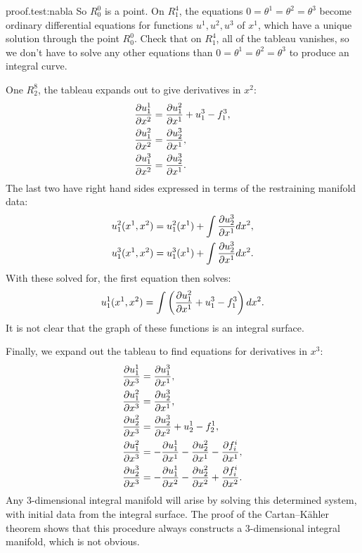 \begin{answer}{proof.test:nabla}
So \(R^0_0\) is a point.
On \(R^4_1\), the equations \(0=\theta^1=\theta^2=\theta^3\) become ordinary differential equations for functions \(u^1,u^2,u^3\) of \(x^1\), which have a unique solution through the point \(R^0_0\).
Check that on \(R^4_1\), all of the tableau vanishes, so we don't have to solve any other equations than \(0=\theta^1=\theta^2=\theta^3\) to produce an integral curve.

One \(R^8_2\), the tableau expands out to give derivatives in \(x^2\):
\begin{align*}
\pderiv{u^1_1}{x^2}&=\pderiv{u^2_1}{x^1}+u^3_1-f^3_1,\\
\pderiv{u^2_1}{x^2}&=\pderiv{u^3_2}{x^1},\\
\pderiv{u^3_1}{x^2}&=\pderiv{u^3_2}{x^1}.
\end{align*}
The last two have right hand sides expressed in terms of the restraining manifold data:
\begin{align*}
u^2_1(x^1,x^2)&=u^2_1(x^1)+\int \pderiv{u^3_2}{x^1} dx^2,\\
u^3_1(x^1,x^2)&=u^3_1(x^1)+\int \pderiv{u^3_2}{x^1} dx^2.
\end{align*}
With these solved for, the first equation then solves:
\[
u^1_1(x^1,x^2)=\int \left(\pderiv{u^2_1}{x^1}+u^3_1-f^3_1\right)dx^2.
\]
It is not clear that the graph of these functions is an integral surface.

Finally, we expand out the tableau to find equations for derivatives in \(x^3\):
\begin{align*}
\pderiv{u^1_1}{x^3}&=\pderiv{u^3_1}{x^1},\\
\pderiv{u^2_1}{x^3}&=\pderiv{u^3_2}{x^1},\\
\pderiv{u^2_2}{x^3}&=\pderiv{u^3_2}{x^2}+u^1_2-f^1_2,\\
\pderiv{u^2_1}{x^3}&=-\pderiv{u^1_1}{x^1}-\pderiv{u^2_2}{x^1}-\pderiv{f^i_i}{x^1},\\
\pderiv{u^3_2}{x^3}&=-\pderiv{u^1_1}{x^2}-\pderiv{u^2_2}{x^2}+\pderiv{f^i_i}{x^2}.
\end{align*}
Any \(3\)-dimensional integral manifold will arise by solving this determined system, with initial data from the integral surface.
The proof of the  Cartan--K\"ahler theorem shows that this procedure always constructs a \(3\)-dimensional integral manifold, which is not obvious.
\end{answer}


